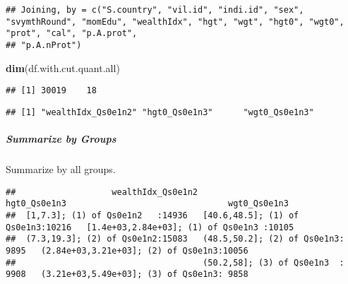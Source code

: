 \documentclass[
]{article}
\newenvironment{Shaded}{\begin{snugshade}}{\end{snugshade}}
\newcommand{\CommentTok}[1]{\textcolor[rgb]{0.56,0.35,0.01}{\textit{#1}}}
\newcommand{\ControlFlowTok}[1]{\textcolor[rgb]{0.13,0.29,0.53}{\textbf{#1}}}
\newcommand{\KeywordTok}[1]{\textcolor[rgb]{0.13,0.29,0.53}{\textbf{#1}}}
\newcommand{\NormalTok}[1]{#1}
\newcommand{\OperatorTok}[1]{\textcolor[rgb]{0.81,0.36,0.00}{\textbf{#1}}}
\newcommand{\StringTok}[1]{\textcolor[rgb]{0.31,0.60,0.02}{#1}}
\begin{document}
\begin{verbatim}
## Joining, by = c("S.country", "vil.id", "indi.id", "sex", "svymthRound", "momEdu", "wealthIdx", "hgt", "wgt", "hgt0", "wgt0", "prot", "cal", "p.A.prot",
## "p.A.nProt")
\end{verbatim}

\begin{Shaded}
\begin{Highlighting}[]
\KeywordTok{dim}\NormalTok{(df.with.cut.quant.all)}
\end{Highlighting}
\end{Shaded}

\begin{verbatim}
## [1] 30019    18
\end{verbatim}

\begin{Shaded}
\end{Shaded}

\begin{verbatim}
## [1] "wealthIdx_Qs0e1n2" "hgt0_Qs0e1n3"      "wgt0_Qs0e1n3"
\end{verbatim}

\hypertarget{summarize-by-groups}{%
\subparagraph{Summarize by Groups}\label{summarize-by-groups}}

Summarize by all groups.

\begin{Shaded}
\end{Shaded}

\begin{verbatim}
##                   wealthIdx_Qs0e1n2                      hgt0_Qs0e1n3                                wgt0_Qs0e1n3  
##  [1,7.3]; (1) of Qs0e1n2   :14936   [40.6,48.5]; (1) of Qs0e1n3:10216   [1.4e+03,2.84e+03]; (1) of Qs0e1n3 :10105  
##  (7.3,19.3]; (2) of Qs0e1n2:15083   (48.5,50.2]; (2) of Qs0e1n3: 9895   (2.84e+03,3.21e+03]; (2) of Qs0e1n3:10056  
##                                     (50.2,58]; (3) of Qs0e1n3  : 9908   (3.21e+03,5.49e+03]; (3) of Qs0e1n3: 9858
\end{verbatim}
\end{document}

